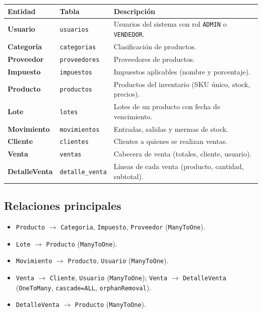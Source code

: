 \documentclass[11pt,a4paper]{article}
\begin{document}
\begin{longtable}{>{\bfseries}p{3cm} p{3.5cm} p{8cm}}
\toprule
\textbf{Entidad} & \textbf{Tabla} & \textbf{Descripción} \\
\midrule
\endhead
Usuario & \texttt{usuarios} & Usuarios del sistema con rol \texttt{ADMIN} o \texttt{VENDEDOR}. \\
Categoria & \texttt{categorias} & Clasificación de productos. \\
Proveedor & \texttt{proveedores} & Proveedores de productos. \\
Impuesto & \texttt{impuestos} & Impuestos aplicables (nombre y porcentaje). \\
Producto & \texttt{productos} & Productos del inventario (SKU único, stock, precios). \\
Lote & \texttt{lotes} & Lotes de un producto con fecha de vencimiento. \\
Movimiento & \texttt{movimientos} & Entradas, salidas y mermas de stock. \\
Cliente & \texttt{clientes} & Clientes a quienes se realizan ventas. \\
Venta & \texttt{ventas} & Cabecera de venta (totales, cliente, usuario). \\
DetalleVenta & \texttt{detalle\_venta} & Líneas de cada venta (producto, cantidad, subtotal). \\
\bottomrule
\end{longtable}

\subsection{Relaciones principales}

\begin{itemize}[noitemsep]
    \item \texttt{Producto} $\to$ \texttt{Categoria}, \texttt{Impuesto},
          \texttt{Proveedor} (\texttt{ManyToOne}).
    \item \texttt{Lote} $\to$ \texttt{Producto} (\texttt{ManyToOne}).
    \item \texttt{Movimiento} $\to$ \texttt{Producto}, \texttt{Usuario}
          (\texttt{ManyToOne}).
    \item \texttt{Venta} $\to$ \texttt{Cliente}, \texttt{Usuario}
          (\texttt{ManyToOne}); \texttt{Venta} $\to$ \texttt{DetalleVenta}
          (\texttt{OneToMany}, \texttt{cascade=ALL}, \texttt{orphanRemoval}).
    \item \texttt{DetalleVenta} $\to$ \texttt{Producto} (\texttt{ManyToOne}).
\end{itemize}
\end{document}
